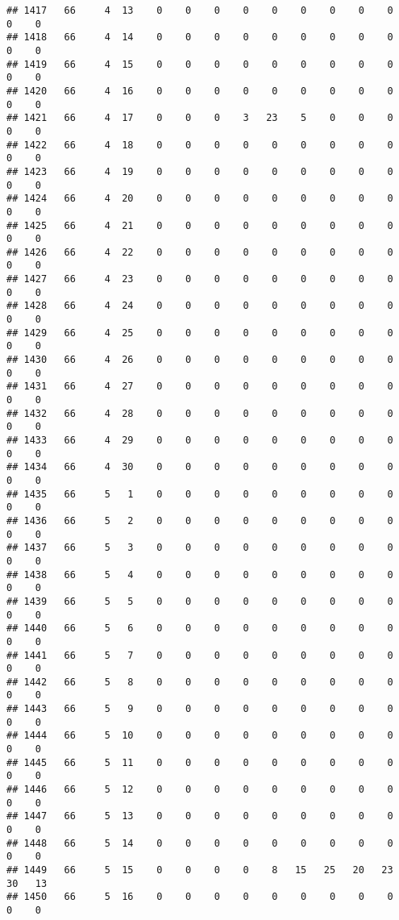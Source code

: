 \documentclass[]{article}
\begin{document}
\begin{verbatim}
## 1417   66     4  13    0    0    0    0    0    0    0    0    0    0    0
## 1418   66     4  14    0    0    0    0    0    0    0    0    0    0    0
## 1419   66     4  15    0    0    0    0    0    0    0    0    0    0    0
## 1420   66     4  16    0    0    0    0    0    0    0    0    0    0    0
## 1421   66     4  17    0    0    0    3   23    5    0    0    0    0    0
## 1422   66     4  18    0    0    0    0    0    0    0    0    0    0    0
## 1423   66     4  19    0    0    0    0    0    0    0    0    0    0    0
## 1424   66     4  20    0    0    0    0    0    0    0    0    0    0    0
## 1425   66     4  21    0    0    0    0    0    0    0    0    0    0    0
## 1426   66     4  22    0    0    0    0    0    0    0    0    0    0    0
## 1427   66     4  23    0    0    0    0    0    0    0    0    0    0    0
## 1428   66     4  24    0    0    0    0    0    0    0    0    0    0    0
## 1429   66     4  25    0    0    0    0    0    0    0    0    0    0    0
## 1430   66     4  26    0    0    0    0    0    0    0    0    0    0    0
## 1431   66     4  27    0    0    0    0    0    0    0    0    0    0    0
## 1432   66     4  28    0    0    0    0    0    0    0    0    0    0    0
## 1433   66     4  29    0    0    0    0    0    0    0    0    0    0    0
## 1434   66     4  30    0    0    0    0    0    0    0    0    0    0    0
## 1435   66     5   1    0    0    0    0    0    0    0    0    0    0    0
## 1436   66     5   2    0    0    0    0    0    0    0    0    0    0    0
## 1437   66     5   3    0    0    0    0    0    0    0    0    0    0    0
## 1438   66     5   4    0    0    0    0    0    0    0    0    0    0    0
## 1439   66     5   5    0    0    0    0    0    0    0    0    0    0    0
## 1440   66     5   6    0    0    0    0    0    0    0    0    0    0    0
## 1441   66     5   7    0    0    0    0    0    0    0    0    0    0    0
## 1442   66     5   8    0    0    0    0    0    0    0    0    0    0    0
## 1443   66     5   9    0    0    0    0    0    0    0    0    0    0    0
## 1444   66     5  10    0    0    0    0    0    0    0    0    0    0    0
## 1445   66     5  11    0    0    0    0    0    0    0    0    0    0    0
## 1446   66     5  12    0    0    0    0    0    0    0    0    0    0    0
## 1447   66     5  13    0    0    0    0    0    0    0    0    0    0    0
## 1448   66     5  14    0    0    0    0    0    0    0    0    0    0    0
## 1449   66     5  15    0    0    0    0    8   15   25   20   23   30   13
## 1450   66     5  16    0    0    0    0    0    0    0    0    0    0    0

\end{verbatim}
\end{document}
